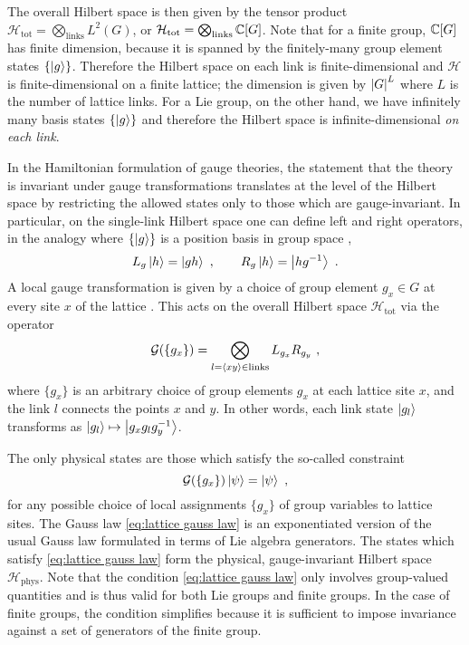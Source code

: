 The overall Hilbert space is then given by the tensor product $\mathcal{H}_{\text{tot}} = \bigotimes_{\mathrm{links}} L^2(G)$, or $\mathcal{H}_{\text{tot}} = \bigotimes_{\mathrm{links}} \mathbb{C}[G]$.
Note that for a finite group, $\mathbb{C}[G]$ has finite dimension, because it is spanned by the finitely-many group element states $\{\ket{g}\}$.
Therefore the Hilbert space on each link is finite-dimensional and $\mathcal{H}$ is finite-dimensional on a finite lattice; the dimension is given by $\abs{G}^L$ where $L$ is the number of lattice links.
For a Lie group, on the other hand, we have infinitely many basis states $\{\ket{g}\}$ and therefore the Hilbert space is infinite-dimensional \textit{on each link}.

\medskip

In the Hamiltonian formulation of gauge theories, the statement that the theory is invariant under gauge transformations translates at the level of the Hilbert space by restricting the allowed states only to those which are gauge-invariant.
In particular, on the single-link Hilbert space one can define left and right  operators, in the analogy where $\{\ket{g}\}$ is a position basis in group space \cite{zohar2015latticegauge},
\begin{equation}
    \label{eq:regular representations}
    L_g \ket{h} = \ket{gh} \ , \quad \quad R_g \ket{h} = \ket{hg^{-1}} \ .
\end{equation}
A local gauge transformation is given by a choice of group element $g_x \in G$ at every site $x$ of the lattice \cite{milstead2018qyangmills}.
This acts on the overall Hilbert space $\mathcal{H}_{\text{tot}}$ via the operator
\begin{equation}
    \label{eq:gauss law operator}
    \mathcal{G}(\{g_x\}) = \bigotimes_{l=\expval{xy} \in \mathrm{links}} L_{g_{x}} R_{g_y} \ ,
\end{equation}
where $\{g_x\}$ is an arbitrary choice of group elements $g_x$ at each lattice site $x$, and the link $l$ connects the points $x$ and $y$.
In other words, each link state $\ket{g_l}$ transforms as $\ket{g_l} \mapsto \ket{g_x g_l g_y^{-1}}$.

The only physical states are those which satisfy the so-called  constraint \cite{kogut1975hamiltonian, milstead2018qyangmills, tong2018gauge}
\begin{equation}
    \label{eq:lattice gauss law}
    \mathcal{G}(\{g_x\}) \ket{\psi}=\ket{\psi} \ ,
\end{equation}
for any possible choice of local assignments $\{g_x\}$ of group variables to lattice sites.
The Gauss law \eqref{eq:lattice gauss law} is an exponentiated version of the usual Gauss law formulated in terms of Lie algebra generators.
The states which satisfy \eqref{eq:lattice gauss law} form the physical, gauge-invariant Hilbert space $\mathcal{H}_\mathrm{phys}$.
Note that the condition \eqref{eq:lattice gauss law} only involves group-valued quantities and is thus valid for both Lie groups and finite groups.
In the case of finite groups, the condition simplifies because it is sufficient to impose invariance against a set of generators of the finite group.


